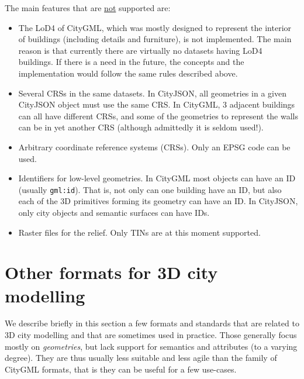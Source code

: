 %

The main features that are \underline{not} supported are:
\begin{itemize}
  \item The LoD4 of CityGML, which was mostly designed to represent the interior of buildings (including details and furniture), is not implemented. The main reason is that currently there are virtually no datasets having LoD4 buildings. If there is a need in the future, the concepts and the implementation would follow the same rules described above.
  \item Several CRSs in the same datasets. In CityJSON, all geometries in a given CityJSON object must use the same CRS\@. In CityGML, 3 adjacent buildings can all have different CRSs, and some of the geometries to represent the walls can be in yet another CRS (although admittedly it is seldom used!).
  \item Arbitrary coordinate reference systems (CRSs). Only an EPSG code can be used. 
  \item Identifiers for low-level geometries. In CityGML most objects can have an ID (usually \texttt{gml:id}). That is, not only can one building have an ID, but also each of the 3D primitives forming its geometry can have an ID\@. In CityJSON, only city objects and semantic surfaces can have IDs.
  \item Raster files for the relief. Only TINs are at this moment supported.
\end{itemize}



%
\section[Other formats]{Other formats for 3D city modelling}

We describe briefly in this section a few formats and standards that are related to 3D city modelling and that are sometimes used in practice.
Those generally focus mostly on \emph{geometries}, but lack support for semantics and attributes (to a varying degree).
They are thus usually less suitable and less agile than the family of CityGML formats, that is they can be useful for a few use-cases.



